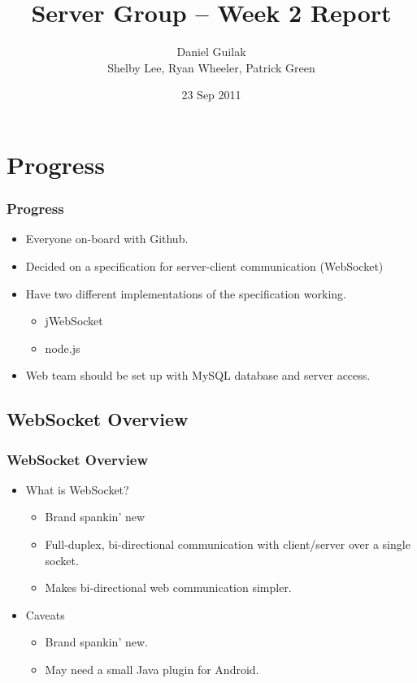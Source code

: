 \documentclass{beamer}
\title[]{Server Group -- Week 2 Report}
\author{Daniel Guilak \\ Shelby Lee, Ryan Wheeler, Patrick Green}
\institute{Vir-Pong}
\date{23 Sep 2011}
\begin{document}
\begin{frame}
\titlepage
\end{frame}

\section{Progress}
\begin{frame}
\frametitle{Progress}
	\begin{itemize}[<+->]
		\item Everyone on-board with Github.
		\item Decided on a specification for server-client communication (WebSocket)
		\item Have two different implementations of the specification working.
		\begin{itemize}
			\item jWebSocket
			\item node.js
		\end{itemize}
		\item Web team should be set up with MySQL database and server access.
		
	\end{itemize}
\end{frame}

\subsection{WebSocket Overview}
\begin{frame}
\frametitle{WebSocket Overview}
	\begin{itemize}[<+->]
		\item What is WebSocket?
		\begin{itemize}
			\item Brand spankin' new
			\item Full-duplex, bi-directional communication with client/server over a single socket.
			\item Makes bi-directional web communication simpler.
		\end{itemize}
		\item Caveats
		\begin{itemize}
			\item Brand spankin' new.
			\item May need a small Java plugin for Android.
		\end{itemize}
	\end{itemize}
\end{frame}
\end{document}
